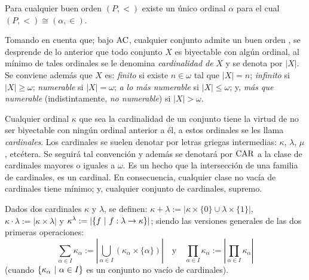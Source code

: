     \begin{teorema}[de enumeración]\label{teo-enumeracion}
        Para cualquier buen orden $(P,<)$ existe un único ordinal $\alpha$ para el cual $(P,<) \cong (\alpha, \in)$.
    \end{teorema}

    Tomando en cuenta que; bajo $\operatorname{AC}$, cualquier conjunto admite un buen orden \cite[Teo.~5.1, p.~48]{jechSet}, se desprende de lo anterior que todo conjunto $X$ es biyectable con algún ordinal, al mínimo de tales ordinales se le denomina \textit{cardinalidad de} $X$ y se denota por $|X|$. Se conviene además que $X$ es: \textit{finito} si existe $n \in \omega$ tal que $|X|=n$; \textit{infinito} si $|X|\geq \omega$; \textit{numerable} si $|X|=\omega$; \textit{a lo más numerable} si $|X|\leq \omega$; y, \textit{más que numerable} (indistintamente, \textit{no numerable}) si $|X|>\omega$.

    \index[sym]{$\CAR$}
    Cualquier ordinal $\kappa$ que sea la cardinalidad de un conjunto tiene la virtud de no ser biyectable con ningún ordinal anterior a él, a estos ordinales se les llama \textit{cardinales}. Los cardinales se suelen denotar por letras griegas intermedias: $\kappa$, $\lambda$, $\mu$, etcétera. Se seguirá tal convención y además se denotará por $\CAR$ a la clase de cardinales mayores o iguales a $\omega$. Es un hecho que la intersección de una familia de cardinales, es un cardinal. En consecuencia, cualquier clase no vacía de cardinales tiene mínimo; y, cualquier conjunto de cardinales, supremo.

    \index[sym]{$\kappa + \lambda$}\index[sym]{$\kappa \cdot \lambda$}\index[sym]{$\kappa ^ \lambda$}
    Dados dos cardinales $\kappa$ y $\lambda$, se definen: $\kappa + \lambda:=|\kappa \times \{0\} \cup \lambda \times \{1\}|$, $\kappa \cdot \lambda:= |\kappa \times \lambda|$ y $\kappa ^ \lambda:= |\{f \text{ $|$ } f:\lambda \to \kappa\}|$; siendo las versiones generales de las dos primeras operaciones:
    \[ \sum_{\alpha \in I} \kappa_\alpha := \left|\bigcup_{\alpha \in I} (\kappa_\alpha \times \{\alpha\})\right| \quad \text{y} \quad \prod_{\alpha \in I} \kappa_\alpha := \left|\prod_{\alpha \in I} \kappa_\alpha\right| \]
    (cuando $\{\kappa_\alpha \text{ $|$ } \alpha \in I\}$ es un conjunto no vacío de cardinales).


